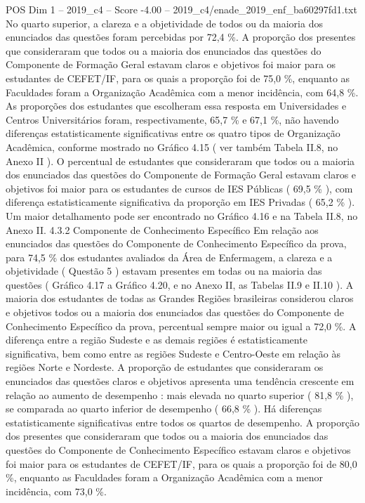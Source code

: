 \begin{textsample}{POS Dim 1 – 2019\_c4 – Score -4.00 – 2019\_c4/enade\_2019\_enf\_ba60297fd1.txt}
No quarto superior, a clareza e a objetividade de todos ou da maioria dos enunciados das questões foram percebidas por 72,4 \%.
A proporção dos presentes que consideraram que todos ou a maioria dos enunciados das questões do Componente de Formação Geral estavam claros e objetivos foi maior para os estudantes de CEFET/IF, para os quais a proporção foi de 75,0 \%, enquanto as Faculdades foram a Organização Acadêmica com a menor incidência, com 64,8 \%.
As proporções dos estudantes que escolheram essa resposta em Universidades e Centros Universitários foram, respectivamente, 65,7 \% e 67,1 \%, não havendo diferenças estatisticamente significativas entre os quatro tipos de Organização Acadêmica, conforme mostrado no Gráfico 4.15 ( ver também Tabela II.8, no Anexo II ).
O percentual de estudantes que consideraram que todos ou a maioria dos enunciados das questões do Componente de Formação Geral estavam claros e objetivos foi maior para os estudantes de cursos de IES Públicas ( 69,5 \% ), com diferença estatisticamente significativa da proporção em IES Privadas ( 65,2 \% ).
Um maior detalhamento pode ser encontrado no Gráfico 4.16 e na Tabela II.8, no Anexo II. 4.3.2 Componente de Conhecimento Específico Em relação aos enunciados das questões do Componente de Conhecimento Específico da prova, para 74,5 \% dos estudantes avaliados da Área de Enfermagem, a clareza e a objetividade ( Questão 5 ) estavam presentes em todas ou na maioria das questões ( Gráfico 4.17 a Gráfico 4.20, e no Anexo II, as Tabelas II.9 e II.10 ).
A maioria dos estudantes de todas as Grandes Regiões brasileiras considerou claros e objetivos todos ou a maioria dos enunciados das questões do Componente de Conhecimento Específico da prova, percentual sempre maior ou igual a 72,0 \%.
A diferença entre a região Sudeste e as demais regiões é estatisticamente significativa, bem como entre as regiões Sudeste e Centro-Oeste em relação às regiões Norte e Nordeste.
A proporção de estudantes que consideraram os enunciados das questões claros e objetivos apresenta uma tendência crescente em relação ao aumento de desempenho : mais elevada no quarto superior ( 81,8 \% ), se comparada ao quarto inferior de desempenho ( 66,8 \% ).
Há diferenças estatisticamente significativas entre todos os quartos de desempenho.
A proporção dos presentes que consideraram que todos ou a maioria dos enunciados das questões do Componente de Conhecimento Específico estavam claros e objetivos foi maior para os estudantes de CEFET/IF, para os quais a proporção foi de 80,0 \%, enquanto as Faculdades foram a Organização Acadêmica com a menor incidência, com 73,0 \%.

\end{textsample}
